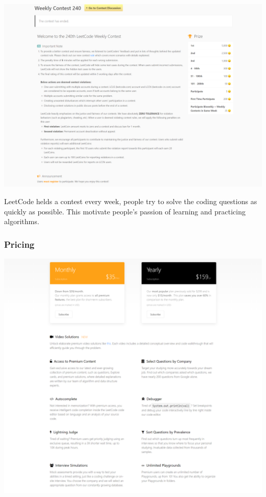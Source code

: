 \documentclass{report}
\begin{document}
\includegraphics[width=\linewidth]{Contest-LeetCode}

LeetCode helds a contest every week, people try to solve the coding questions as quickly as possible. This motivate people's passion of learning and practicing algorithms.

\subsubsection{Pricing}

\includegraphics[width=\linewidth]{LeetCode-Premium}
\end{document}
